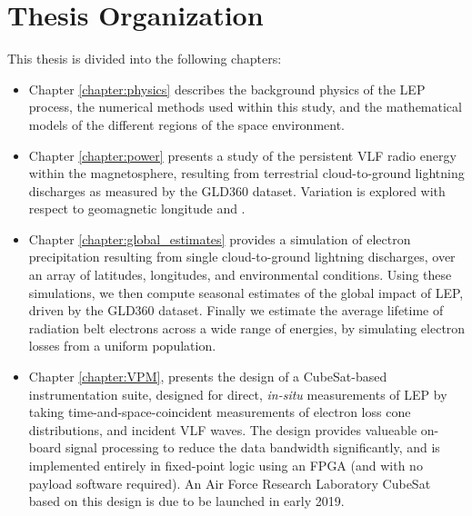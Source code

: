 \section{Thesis Organization}
This thesis is divided into the following chapters:
\begin{itemize}
\item Chapter \ref{chapter:physics} describes the background physics of the LEP process, the numerical methods used within this study, and the mathematical models of the different regions of the space environment. 
\item Chapter \ref{chapter:power} presents a study of the persistent VLF radio energy within the magnetosphere, resulting from terrestrial cloud-to-ground lightning discharges as measured by the GLD360 dataset. Variation is explored with respect to geomagnetic longitude and \kp{}. 
\item Chapter \ref{chapter:global_estimates} provides a simulation of electron precipitation resulting from single cloud-to-ground lightning discharges, over an array of latitudes, longitudes, and environmental conditions. Using these simulations, we then compute seasonal estimates of the global impact of LEP, driven by the GLD360 dataset. Finally we estimate the average lifetime of radiation belt electrons across a wide range of energies, by simulating electron losses from a uniform population.

\item Chapter \ref{chapter:VPM}, presents the design of a CubeSat-based instrumentation suite, designed for direct, \emph{in-situ} measurements of LEP by taking time-and-space-coincident measurements of electron loss cone distributions, and incident VLF waves. The design provides valueable on-board signal processing to reduce the data bandwidth significantly, and is implemented entirely in fixed-point logic using an FPGA (and with no payload software required). An Air Force Research Laboratory CubeSat based on this design is due to be launched in early 2019.
\end{itemize}

